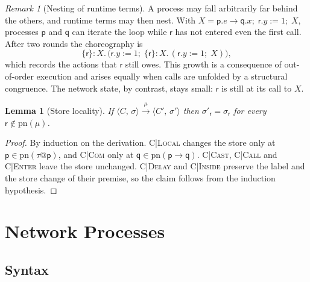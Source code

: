\documentclass[11pt]{article}
\makeatletter
\theoremstyle{plain}
\newtheorem{lemma}[theorem]{Lemma}
\theoremstyle{definition}
\theoremstyle{remark}
\newtheorem{remark}[theorem]{Remark}
\newcommand{\seq}{;\;}
\newcommand{\pp}{\mathsf{p}}
\newcommand{\qq}{\mathsf{q}}
\newcommand{\rr}{\mathsf{r}}
\newcommand{\pn}{\mathrm{pn}}
\newcommand{\conf}[2]{\langle #1,\, #2\rangle}
\newcommand{\lto}[1]{\xrightarrow{\;#1\;}}
\newcommand{\tauat}[1]{\tau\mathord{@}#1}
\newcommand{\rn}[1]{{\normalfont\scshape #1}}
\newcommand{\rt}[3]{#1\mathbin{:}#2.\,#3}
\makeatother
\begin{document}
\begin{remark}[Nesting of runtime terms]\label{rem:nesting}
  A process may fall arbitrarily far behind the others, and runtime terms may
  then nest.  With $X = \pp.e \to \qq.x \seq \rr.y := 1 \seq X$, processes
  $\pp$ and $\qq$ can iterate the loop while $\rr$ has not entered even the
  first call.  After two rounds the choreography is
  \[
    \rt{\{\rr\}}{X}{\big(\rr.y := 1 \seq
      \rt{\{\rr\}}{X}{(\rr.y := 1 \seq X)}\big)},
  \]
  which records the actions that $\rr$ still owes.  This growth is a
  consequence of out-of-order execution and arises equally when calls are
  unfolded by a structural congruence.  The network state, by contrast, stays
  small: $\rr$ is still at its call to $X$.
\end{remark}

\begin{lemma}[Store locality]\label{lem:chor-locality}
  If $\conf{C}{\sigma} \lto{\mu} \conf{C'}{\sigma'}$ then
  $\sigma'_\rr = \sigma_\rr$ for every $\rr \notin \pn(\mu)$.
\end{lemma}
\begin{proof}
  By induction on the derivation.  \rn{C|Local} changes the store only at
  $\pp \in \pn(\tauat\pp)$, and \rn{C|Com} only at $\qq \in \pn(\pp\to\qq)$.
  \rn{C|Cast}, \rn{C|Call} and \rn{C|Enter} leave the store unchanged.
  \rn{C|Delay} and \rn{C|Inside} preserve the label and the store change of
  their premise, so the claim follows from the induction hypothesis.
\end{proof}

\section{Network Processes}
\label{sec:net}

\subsection{Syntax}
\end{document}
